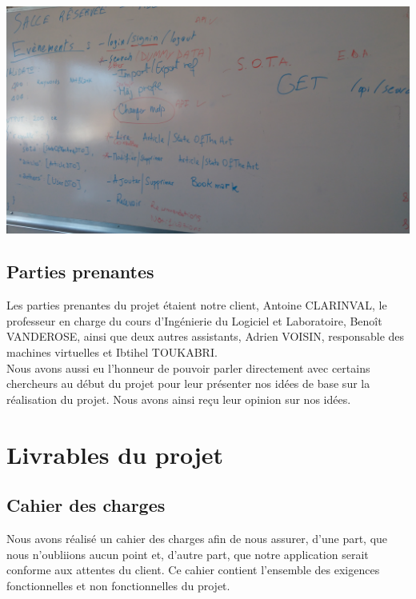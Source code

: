 \documentclass[t, 12pt, usenames,dvipsnames]{article}
\begin{document}
            \begin{center}                               
                \includegraphics[scale=.08]{images/sprint/exemple-tableau.jpg}
                \label{fig:tableau_todo}
            \end{center}
            
        \newpage
        
        \subsection{Parties prenantes}
            \noindent Les parties prenantes du projet étaient notre client, Antoine CLARINVAL, le professeur en charge du cours d'Ingénierie du Logiciel et Laboratoire, Benoît VANDEROSE, ainsi que deux autres assistants, Adrien VOISIN, responsable des machines virtuelles et Ibtihel TOUKABRI.\\
            Nous avons aussi eu l'honneur de pouvoir parler directement avec certains chercheurs au début du projet pour leur présenter nos idées de base sur la réalisation du projet. Nous avons ainsi reçu leur opinion sur nos idées.

    \newpage
    
    \section{Livrables du projet}
        
        \subsection{Cahier des charges}
            \noindent Nous avons réalisé un cahier des charges afin de nous assurer, d'une part, que nous n'oubliions aucun point et, d'autre part, que notre application serait conforme aux attentes du client. Ce cahier contient l'ensemble des exigences fonctionnelles et non fonctionnelles du projet.
            
\end{document}
